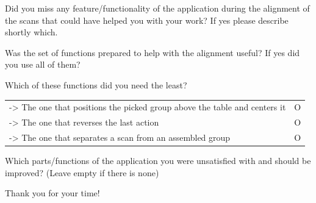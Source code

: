 \documentclass[hyperref,english,bachelorofscience,bibnum,twoside]{cgvpub}
\begin{document}
Did you miss any feature/functionality of the application during the alignment of the scans that could have helped you with your work? If yes please describe shortly which.

\noindent\makebox[\linewidth]{\rule{\linewidth}{0.4pt}}

Was the set of functions prepared to help with the alignment useful? If yes did you use all of them?

\noindent\makebox[\linewidth]{\rule{\linewidth}{0.4pt}}

Which of these functions did you need the least?

\begin{tabular}{l r}
-> The one that positions the picked group above the table and centers it & O \\
-> The one that reverses the last action & O \\
-> The one that separates a scan from an assembled group & O \\
\end{tabular}


Which parts/functions of the application you were unsatisfied with and should be improved? 
(Leave empty if there is none)

\noindent\makebox[\linewidth]{\rule{\linewidth}{0.4pt}}
\noindent\makebox[\linewidth]{\rule{\linewidth}{0.4pt}}
\noindent\makebox[\linewidth]{\rule{\linewidth}{0.4pt}}

Thank you for your time!
\end{document}

